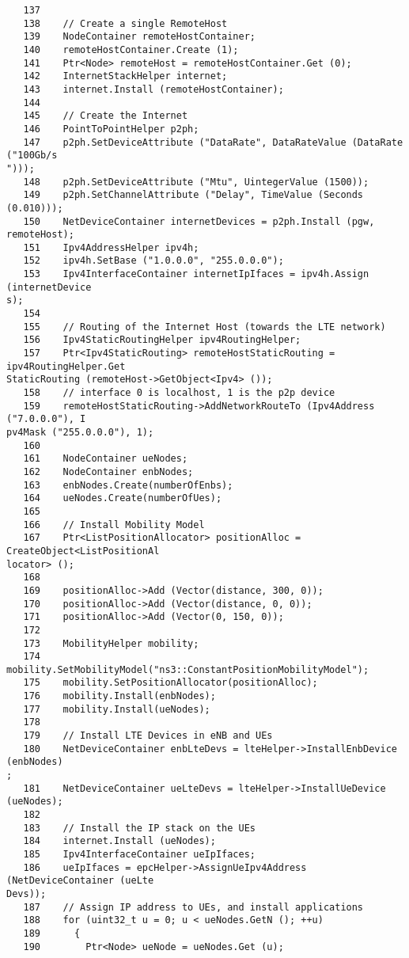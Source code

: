 \begin{verbatim}
   137
   138    // Create a single RemoteHost
   139    NodeContainer remoteHostContainer;
   140    remoteHostContainer.Create (1);
   141    Ptr<Node> remoteHost = remoteHostContainer.Get (0);
   142    InternetStackHelper internet;
   143    internet.Install (remoteHostContainer);
   144
   145    // Create the Internet
   146    PointToPointHelper p2ph;
   147    p2ph.SetDeviceAttribute ("DataRate", DataRateValue (DataRate ("100Gb/s
")));
   148    p2ph.SetDeviceAttribute ("Mtu", UintegerValue (1500));
   149    p2ph.SetChannelAttribute ("Delay", TimeValue (Seconds (0.010)));
   150    NetDeviceContainer internetDevices = p2ph.Install (pgw, remoteHost);
   151    Ipv4AddressHelper ipv4h;
   152    ipv4h.SetBase ("1.0.0.0", "255.0.0.0");
   153    Ipv4InterfaceContainer internetIpIfaces = ipv4h.Assign (internetDevice
s);
   154
   155    // Routing of the Internet Host (towards the LTE network)
   156    Ipv4StaticRoutingHelper ipv4RoutingHelper;
   157    Ptr<Ipv4StaticRouting> remoteHostStaticRouting = ipv4RoutingHelper.Get
StaticRouting (remoteHost->GetObject<Ipv4> ());
   158    // interface 0 is localhost, 1 is the p2p device
   159    remoteHostStaticRouting->AddNetworkRouteTo (Ipv4Address ("7.0.0.0"), I
pv4Mask ("255.0.0.0"), 1);
   160
   161    NodeContainer ueNodes;
   162    NodeContainer enbNodes;
   163    enbNodes.Create(numberOfEnbs);
   164    ueNodes.Create(numberOfUes);
   165
   166    // Install Mobility Model
   167    Ptr<ListPositionAllocator> positionAlloc = CreateObject<ListPositionAl
locator> ();
   168    
   169    positionAlloc->Add (Vector(distance, 300, 0));
   170    positionAlloc->Add (Vector(distance, 0, 0));
   171    positionAlloc->Add (Vector(0, 150, 0));
   172    
   173    MobilityHelper mobility;
   174    mobility.SetMobilityModel("ns3::ConstantPositionMobilityModel");
   175    mobility.SetPositionAllocator(positionAlloc);
   176    mobility.Install(enbNodes);
   177    mobility.Install(ueNodes);
   178
   179    // Install LTE Devices in eNB and UEs
   180    NetDeviceContainer enbLteDevs = lteHelper->InstallEnbDevice (enbNodes)
;
   181    NetDeviceContainer ueLteDevs = lteHelper->InstallUeDevice (ueNodes);
   182
   183    // Install the IP stack on the UEs
   184    internet.Install (ueNodes);
   185    Ipv4InterfaceContainer ueIpIfaces;
   186    ueIpIfaces = epcHelper->AssignUeIpv4Address (NetDeviceContainer (ueLte
Devs));
   187    // Assign IP address to UEs, and install applications
   188    for (uint32_t u = 0; u < ueNodes.GetN (); ++u)
   189      {
   190        Ptr<Node> ueNode = ueNodes.Get (u);

\end{verbatim}
